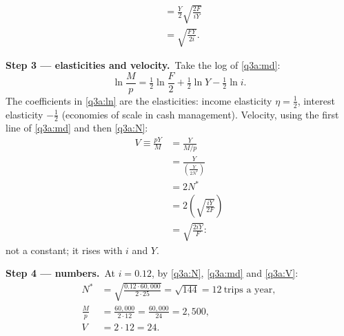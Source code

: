 \documentclass[11pt,a4paper]{article}
\newcommand{\passo}[2]{\par\smallskip\noindent\textbf{Step #1.}~#2}
\begin{document}
\begin{sol}
{\begin{align}
&= \frac{Y}{2}\sqrt{\frac{2F}{iY}}\nonumber\\
&= \sqrt{\frac{FY}{2i}}. \label{q3a:md}
\end{align}}
\passo{3 --- elasticities and velocity}{Take the log of \eqref{q3a:md}:
\begin{equation}
\ln\frac Mp=\tfrac12\ln\frac F2+\tfrac12\ln Y-\tfrac12\ln i. \label{q3a:ln}
\end{equation}
The coefficients in \eqref{q3a:ln} are the elasticities: income elasticity $\boxed{\eta=\tfrac12}$, interest
elasticity $\boxed{-\tfrac12}$ (economies of scale in cash management). Velocity, using the first line of
\eqref{q3a:md} and then \eqref{q3a:N}:
\begin{align}
V\equiv\frac{pY}{M} &= \frac{Y}{M/p}\nonumber\\
&= \frac{Y}{\left(\frac{Y}{2N^*}\right)}\nonumber\\
&= 2N^*\nonumber\\
&= 2\left(\sqrt{\frac{iY}{2F}}\right)\nonumber\\
&= \sqrt{\frac{2iY}{F}}: \label{q3a:V}
\end{align}
not a constant; it rises with $i$ and $Y$.}
\passo{4 --- numbers}{At $i=0.12$, by \eqref{q3a:N}, \eqref{q3a:md} and \eqref{q3a:V}:
\begin{align*}
N^* &= \sqrt{\frac{0.12\cdot60{,}000}{2\cdot25}}=\sqrt{144}=\boxed{12}\ \text{trips a year},\\
\frac Mp &= \frac{60{,}000}{2\cdot12}=\frac{60{,}000}{24}=\boxed{2{,}500},\\
V &= 2\cdot12=\boxed{24}.
\end{align*}}
\begin{center}
\end{center}
\end{sol}
\end{document}
